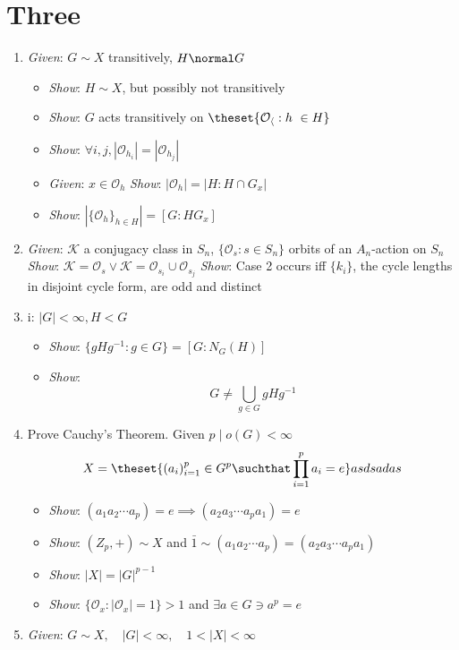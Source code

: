 \hypertarget{three}{%
\section{Three}\label{three}}

\begin{enumerate}
\def\labelenumi{\arabic{enumi}.}
\item
  \emph{Given}: $G \sim X$ transitively, $H \normal G$

  \begin{itemize}
  \tightlist
  \item
    \emph{Show}: $H \sim X$, but possibly not transitively
  \item
    \emph{Show}: $G$ acts transitively on
    $\theset{ \mathcal{O_h} : h\ \in H}$
  \item
    \emph{Show}:
    $\forall i, j, |\mathcal{O}_{h_i}| = |\mathcal{O}_{h_j}|$
  \item
    \emph{Given}: $x\in \mathcal{O}_h$ \emph{Show}:
    $|\mathcal{O}_h| = |H : H \cap G_x|$
  \item
    \emph{Show}: $|\{\mathcal{O}_h\}_{h\in H}| = [G : HG_x]$
  \end{itemize}
\item
  \emph{Given}: $\mathcal{K}$ a conjugacy class in $S_n$,
  $\{\mathcal{O}_{s}:s\in S_n\}$ orbits of an $A_n$-action on $S_n$
  \emph{Show}:
  $\mathcal{K} = \mathcal{O}_s \vee \mathcal{K} = \mathcal{O}_{s_i} \cup \mathcal{O}_{s_j}$
  \emph{Show}: Case 2 occurs iff $\{k_i\}$, the cycle lengths in
  disjoint cycle form, are odd and distinct
\item
  i: $|G| < \infty, H < G$

  \begin{itemize}
  \tightlist
  \item
    \emph{Show}: $\{ gHg^{-1} : g\in G\} = [G : N_G(H)]$
  \item
    \emph{Show}: $$G \neq \bigcup_{g\in G} gHg^{-1}$$
  \end{itemize}
\item
  Prove Cauchy's Theorem. Given $p\mid o(G) <\infty$ $$
  X = \theset{ (a_{i})_{i=1}^p \in G^p \suchthat \prod_{i=1}^p a_i = e} \\
  asdsadas
  $$

  \begin{itemize}
  \tightlist
  \item
    \emph{Show}:
    $(a_1 a_2\cdots a_p) = e \implies (a_2 a_3 \cdots a_p a_1) = e$
  \item
    \emph{Show}: $(Z_p, +) \sim X$ and
    $\bar 1 \sim (a_1 a_2 \cdots a_p) = (a_2 a_3 \cdots a_p a_1)$
  \item
    \emph{Show}: $|X| = |G|^{p-1}$
  \item
    \emph{Show}: $\{ \mathcal{O}_x : |\mathcal{O}_x| = 1 \} > 1$ and
    $\exists a \in G \ni a^p = e$
  \end{itemize}
\item
  \emph{Given}: $G \sim X, \quad |G| < \infty , \quad 1 < |X| < \infty$
\end{enumerate}

